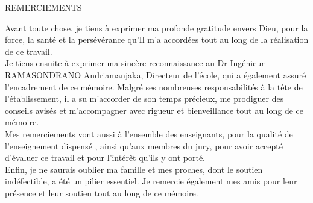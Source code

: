 \documentclass[a4paper,12pt, oneside]{article}
\begin{document}
\begin{center}
\LARGE{REMERCIEMENTS}
\end{center}

Avant toute chose, je tiens à exprimer ma profonde gratitude envers Dieu, pour la force, la santé et la persévérance qu'Il m'a accordées tout au long de la réalisation de ce travail.\\

Je tiens ensuite à exprimer ma sincère reconnaissance au Dr Ingénieur RAMASONDRANO Andriamanjaka, Directeur de l'école, qui a également assuré l'encadrement de ce mémoire. Malgré ses nombreuses responsabilités à la tête de l'établissement, il a su m'accorder de son temps précieux, me prodiguer des conseils avisés et m'accompagner avec rigueur et bienveillance tout au long de ce mémoire.\\

Mes remerciements vont aussi à l'ensemble des enseignants, pour la qualité de l'enseignement dispensé , ainsi qu'aux membres du jury, pour avoir accepté d'évaluer ce travail et pour l'intérêt qu'ils y ont porté.\\

Enfin, je ne saurais oublier ma famille et mes proches, dont le soutien indéfectible, a été un pilier essentiel. Je remercie également mes amis pour leur présence et leur soutien tout au long de ce mémoire.\\
\end{document}
